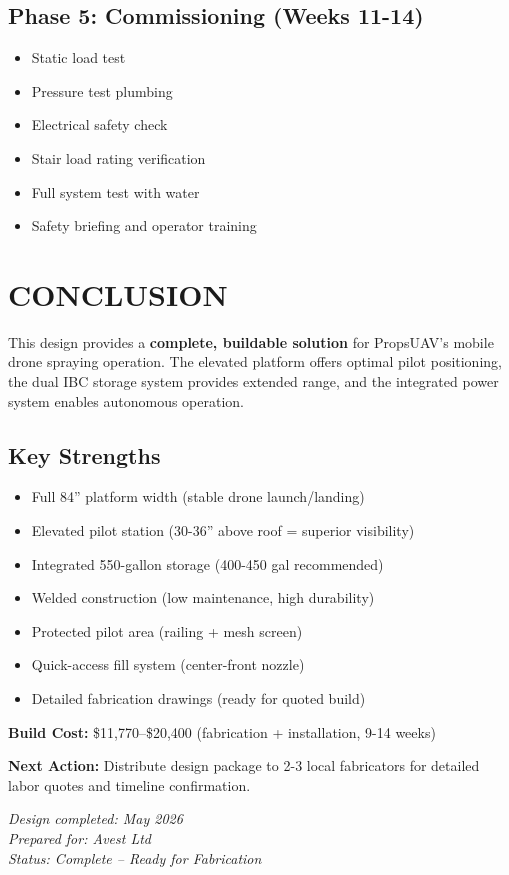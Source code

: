 \documentclass[11pt,letter]{article}
\begin{document}
\subsection{Phase 5: Commissioning (Weeks 11-14)}
\begin{itemize}
  \item Static load test
  \item Pressure test plumbing
  \item Electrical safety check
  \item Stair load rating verification
  \item Full system test with water
  \item Safety briefing and operator training
\end{itemize}

\section{CONCLUSION}

This design provides a \textbf{complete, buildable solution} for PropsUAV's mobile drone spraying operation. The elevated platform offers optimal pilot positioning, the dual IBC storage system provides extended range, and the integrated power system enables autonomous operation.

\subsection*{Key Strengths}
\begin{itemize}
  \item [\checkmark] Full 84'' platform width (stable drone launch/landing)
  \item [\checkmark] Elevated pilot station (30-36'' above roof = superior visibility)
  \item [\checkmark] Integrated 550-gallon storage (400-450 gal recommended)
  \item [\checkmark] Welded construction (low maintenance, high durability)
  \item [\checkmark] Protected pilot area (railing + mesh screen)
  \item [\checkmark] Quick-access fill system (center-front nozzle)
  \item [\checkmark] Detailed fabrication drawings (ready for quoted build)
\end{itemize}

\textbf{Build Cost:} \$11,770--\$20,400 (fabrication + installation, 9-14 weeks)

\textbf{Next Action:} Distribute design package to 2-3 local fabricators for detailed labor quotes and timeline confirmation.

\vspace{0.5in}

\textit{Design completed: May 2026} \\
\textit{Prepared for: Avest Ltd} \\
\textit{Status: Complete -- Ready for Fabrication}
\end{document}
